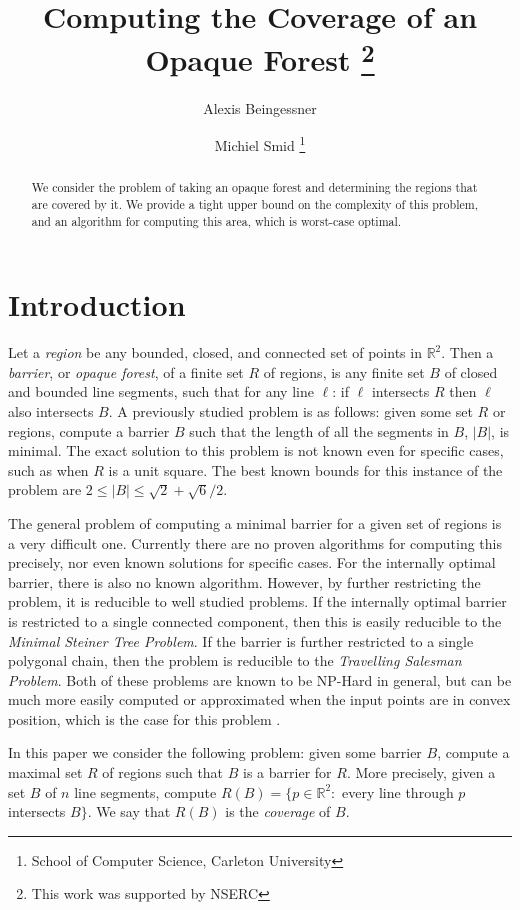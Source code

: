 \documentclass{cccg12}
\title{Computing the Coverage of an Opaque Forest \thanks{This work was supported by NSERC}}
\author{Alexis Beingessner \and Michiel Smid \thanks{School of Computer Science, Carleton University}}
\begin{document}
\thispagestyle{empty}
\maketitle



\begin{abstract}
We consider the problem of taking an opaque forest and determining the regions that are covered by it. We provide a tight upper bound on the complexity of this problem, and an algorithm for computing this area, which is worst-case optimal.
\end{abstract}




\section{Introduction}
Let a \emph{region} be any bounded, closed, and connected set of points in $\mathds{R}^2$. Then a \emph{barrier}, or \emph{opaque forest}, of a finite set $R$ of regions, is any finite set $B$ of closed and bounded line segments, such that for any line $\ell$: if $\ell$ intersects $R$ then $\ell$ also intersects $B$. A previously studied problem is as follows: given some set $R$ or regions, compute a barrier $B$ such that the length of all the segments in $B$, $|B|$, is minimal. The exact solution to this problem is not known even for specific cases, such as when $R$ is a unit square. The best known bounds for this instance of the problem are $2 \leq |B| \leq \sqrt{2} + \sqrt{6}/2$. \cite{Dumitrescu2010}

The general problem of computing a minimal barrier for a given set of regions is a very difficult one. Currently there are no proven algorithms for computing this precisely, nor even known solutions for specific cases. For the internally optimal barrier, there is also no known algorithm. However, by further restricting the problem, it is reducible to well studied problems. If the internally optimal barrier is restricted to a single connected component, then this is easily reducible to the \emph{Minimal Steiner Tree Problem}. If the barrier is further restricted to a single polygonal chain, then the problem is reducible to the \emph{Travelling Salesman Problem}. Both of these problems are known to be NP-Hard in general, but can be much more easily computed or approximated when the input points are in convex position, which is the case for this problem \cite{Dumitrescu2010}.

In this paper we consider the following problem: given some barrier $B$, compute a maximal set $R$ of regions such that $B$ is a barrier for $R$. More precisely, given a set $B$ of $n$ line segments, compute $R(B) = \{p \in \mathds{R}^2:$ every line through $p$ intersects $B\}$. We say that $R(B)$ is the \emph{coverage} of $B$.
\end{document}
